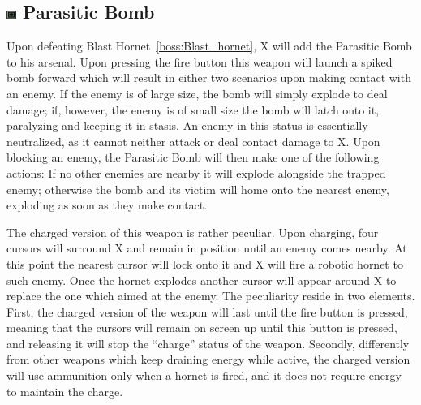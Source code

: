 \subsection{\includegraphics[width=12px, height=10px]{figures/X3/weapons/P_bomb.jpg} Parasitic Bomb}\label{Parasitic_Bomb}

Upon defeating Blast Hornet~\ref{boss:Blast_hornet}, X will add the Parasitic Bomb to his arsenal. Upon pressing the fire button this weapon will launch a spiked bomb forward which will result in either two scenarios upon making contact with an enemy. If the enemy is of large size, the bomb will simply explode to deal damage; if, however, the enemy is of small size the bomb will latch onto it, paralyzing and keeping it in stasis. An enemy in this status is essentially neutralized, as it cannot neither attack or deal contact damage to X. Upon blocking an enemy, the Parasitic Bomb will then make one of the following actions: If no other enemies are nearby it will explode alongside the trapped enemy; otherwise the bomb and its victim will home onto the nearest enemy, exploding as soon as they make contact. 

The charged version of this weapon is rather peculiar. Upon charging, four cursors will surround X and remain in position until an enemy comes nearby. At this point the nearest cursor will lock onto it and X will fire a robotic hornet to such enemy. Once the hornet explodes another cursor will appear around X to replace the one which aimed at the enemy. The peculiarity reside in two elements. First, the charged version of the weapon will last until the fire button is pressed, meaning that the cursors will remain on screen up until this button is pressed, and releasing it will stop the ``charge'' status of the weapon. Secondly, differently from other weapons which keep draining energy while active, the charged version will use ammunition only when a hornet is fired, and it does not require energy to maintain the charge.

